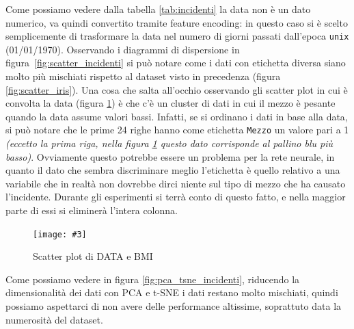 \documentclass[12pt, twoside, letterpaper]{report}
\newcommand{\img}[4] {
	\begin{figure}
		\centering
		\texttt{[image: \#3]}\\
		\caption{#1}
		\label{fig:#4}
	\end{figure}
}
\begin{document}
			Come possiamo vedere dalla tabella \ref{tab:incidenti} la data non è un dato numerico, va quindi convertito tramite feature encoding: in questo caso si è scelto semplicemente di trasformare la data nel numero di giorni passati dall'epoca \texttt{unix} (01/01/1970). Osservando i diagrammi di dispersione in figura~\ref{fig:scatter_incidenti} si può notare come i dati con etichetta diversa siano molto più mischiati rispetto al dataset visto in precedenza (figura \ref{fig:scatter_iris}). Una cosa che salta all'occhio osservando gli scatter plot in cui è convolta la data (figura \ref{fig:scatter_data}) è che c'è un cluster di dati in cui il mezzo è pesante quando la data assume valori bassi. Infatti, se si ordinano i dati in base alla data, si può notare che le prime 24 righe hanno come etichetta \texttt{Mezzo} un valore pari a 1 \textit{(eccetto la prima riga, nella figura \ref{fig:scatter_data} questo dato corrisponde al pallino blu più basso)}. Ovviamente questo potrebbe essere un problema per la rete neurale, in quanto il dato che sembra discriminare meglio l'etichetta è quello relativo a una variabile che in realtà non dovrebbe dirci niente sul tipo di mezzo che ha causato l'incidente. Durante gli esperimenti si terrà conto di questo fatto, e nella maggior parte di essi si eliminerà l'intera colonna. 
			
			\img{Scatter plot di DATA e BMI}{0.4}{scatter_data.png}{scatter_data}
			
			Come possiamo vedere in figura \ref{fig:pca_tsne_incidenti}, riducendo la dimensionalità dei dati con PCA e t-SNE i dati restano molto mischiati, quindi possiamo aspettarci di non avere delle performance altissime, soprattuto data la numerosità del dataset.
			
\end{document}
